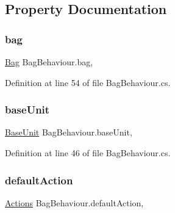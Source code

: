\subsection{Property Documentation}
\mbox{\label{class_bag_behaviour_a2ce7c6b9e26738b42f953a3351b8b1b4}} 
\subsubsection{\texorpdfstring{bag}{bag}}
{\footnotesize\ttfamily \mbox{\hyperlink{class_bag}{Bag}} Bag\+Behaviour.\+bag\hspace{0.3cm}{\ttfamily [get]}, {\ttfamily [set]}}



Definition at line 54 of file Bag\+Behaviour.\+cs.

\mbox{\label{class_bag_behaviour_a902e05fcee6312ba24825f3d9f785b8b}} 
\subsubsection{\texorpdfstring{baseUnit}{baseUnit}}
{\footnotesize\ttfamily \mbox{\hyperlink{class_base_unit}{Base\+Unit}} Bag\+Behaviour.\+base\+Unit\hspace{0.3cm}{\ttfamily [get]}, {\ttfamily [set]}}



Definition at line 46 of file Bag\+Behaviour.\+cs.

\mbox{\label{class_bag_behaviour_aee692afcced72398af07f9df77990b09}} 
\subsubsection{\texorpdfstring{defaultAction}{defaultAction}}
{\footnotesize\ttfamily \mbox{\hyperlink{class_bag_behaviour_aeafbbbda3c9a34d1a73647a8b274788c}{Actions}} Bag\+Behaviour.\+default\+Action\hspace{0.3cm}{\ttfamily [get]}, {\ttfamily [set]}}



